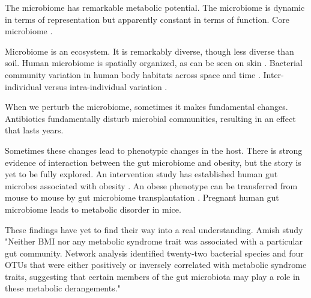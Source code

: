\documentclass{amsart}
\begin{document}
The microbiome has remarkable metabolic potential.
\cite{qin2010human}
The microbiome is dynamic in terms of representation but apparently constant in terms of function.
\cite{hmp2012structure}
Core microbiome \cite{turnbaugh2008core}.

Microbiome is an ecosystem.
It is remarkably diverse, though less diverse than soil.
Human microbiome is spatially organized, as can be seen on skin \cite{grice2009topographical}.
Bacterial community variation in human body habitats across space and time \cite{costello2009bacterial}.
Inter-individual versus intra-individual variation \cite{hmp2012structure}.

When we perturb the microbiome, sometimes it makes fundamental changes.
Antibiotics fundamentally disturb microbial communities, resulting in an effect that lasts years.
\cite{jernberg2007long,dethlefsen2008pervasive,jakobsson2010short,dethlefsen2011incomplete}

Sometimes these changes lead to phenotypic changes in the host.
There is strong evidence of interaction between the gut microbiome and obesity, but the story is yet to be fully explored.
An intervention study has established human gut microbes associated with obesity \cite{ley2006microbial}.
An obese phenotype can be transferred from mouse to mouse by gut microbiome transplantation \cite{turnbaugh2006obesity}.
Pregnant human gut microbiome \cite{koren2012host} leads to metabolic disorder in mice.

These findings have yet to find their way into a real understanding.
Amish study \cite{zupancic2012analysis}
"Neither BMI nor any metabolic syndrome trait was associated with a particular gut community. Network analysis identified twenty-two bacterial species and four OTUs that were either positively or inversely correlated with metabolic syndrome traits, suggesting that certain members of the gut microbiota may play a role in these metabolic derangements."
\end{document}
